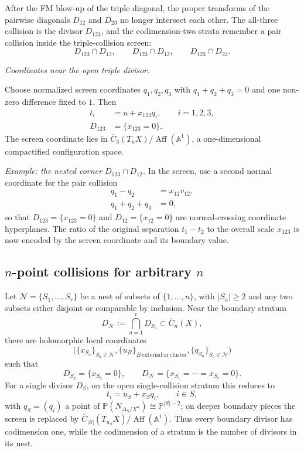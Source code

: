 \begin{example}
After the FM blow-up of the triple diagonal, the proper transforms of
the pairwise diagonals $D_{12}$ and $D_{23}$ no longer intersect each
other. The all-three collision is the divisor $D_{123}$, and the
codimension-two strata remember a pair collision inside the
triple-collision screen:
\[
D_{123}\cap D_{12},\qquad D_{123}\cap D_{13},\qquad
D_{123}\cap D_{23}.
\]

\emph{Coordinates near the open triple divisor.}

Choose normalized screen coordinates $q_1,q_2,q_3$ with
$q_1+q_2+q_3=0$ and one non-zero difference fixed to $1$. Then
\begin{align}
t_i &= u+x_{123}q_i,\qquad i=1,2,3,\\
D_{123}&=\{x_{123}=0\}.
\end{align}
The screen coordinate lies in
$\overline{C}_3(T_uX)/\operatorname{Aff}(\mathbb{A}^1)$, a
one-dimensional compactified configuration space.

\emph{Example: the nested corner $D_{123}\cap D_{12}$.}
In the screen, use a second normal coordinate for the pair collision
\begin{align}
q_1-q_2 &= x_{12}v_{12},\\
q_1+q_2+q_3&=0,
\end{align}
so that $D_{123}=\{x_{123}=0\}$ and $D_{12}=\{x_{12}=0\}$ are
normal-crossing coordinate hyperplanes. The ratio of the original
separation $t_1-t_2$ to the overall scale $x_{123}$ is now encoded by
the screen coordinate and its boundary value.
\end{example}

\subsection{\texorpdfstring{$n$-point collisions for arbitrary $n$}{n-point collisions for arbitrary n}}

\begin{theorem}\label{thm:complete-coordinates}
Let $\mathcal N=\{S_1,\ldots,S_r\}$ be a nest of subsets of
$\{1,\ldots,n\}$, with $|S_a|\geq2$ and any two subsets either disjoint
or comparable by inclusion. Near the boundary stratum
\[
D_{\mathcal N}:=\bigcap_{a=1}^r D_{S_a}\subset \overline{C}_n(X),
\]
there are holomorphic local coordinates
\[
\bigl(\{x_{S_a}\}_{S_a\in\mathcal N},
\{u_B\}_{B\ \mathrm{external\ or\ cluster}},
\{q_{S_a}\}_{S_a\in\mathcal N}\bigr)
\]
such that
\[
D_{S_a}=\{x_{S_a}=0\},\qquad
D_{\mathcal N}=\{x_{S_1}=\cdots=x_{S_r}=0\}.
\]
For a single divisor $D_S$, on the open single-collision stratum this
reduces to
\[
t_i=u_S+x_Sq_i,\qquad i\in S,
\]
with $q_S=(q_i)$ a point of
$\mathbb P(N_{\Delta_S/X^n})\cong\mathbb P^{|S|-2}$; on deeper
boundary pieces the screen is replaced by
$\overline C_{|S|}(T_{u_S}X)/\operatorname{Aff}(\mathbb{A}^1)$.
Thus every boundary divisor has codimension one, while the codimension
of a stratum is the number of divisors in its nest.
\end{theorem}

